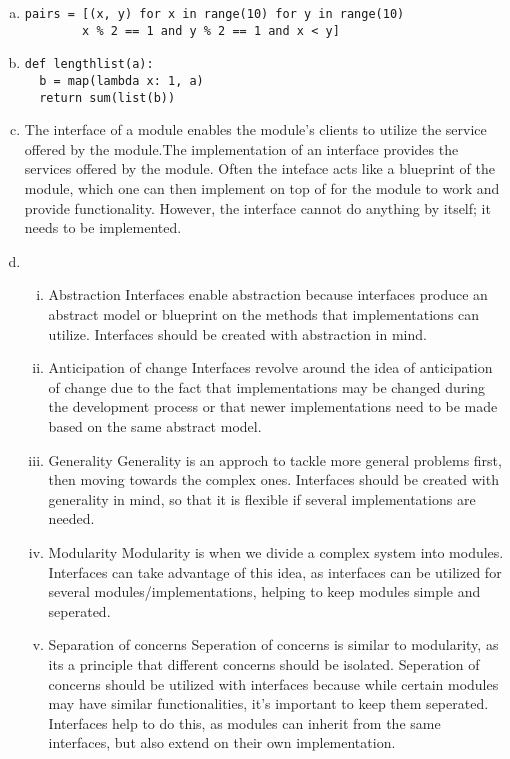 \documentclass[12pt]{article}
\begin{document}
\begin{enumerate}[a)]
\item
\begin{lstlisting}
pairs = [(x, y) for x in range(10) for y in range(10) 
		x % 2 == 1 and y % 2 == 1 and x < y]
\end{lstlisting}

\item
\begin{lstlisting}
def lengthlist(a):
  b = map(lambda x: 1, a)
  return sum(list(b))
\end{lstlisting}

\item
The interface of a module enables the module's clients to utilize the service offered by the module.The implementation of an interface provides the services offered by the module. Often the inteface acts like a blueprint of the module, which one can then implement on top of for the module to work and provide functionality. However, the interface cannot do anything by itself; it needs to be implemented.

\item
  \begin{enumerate}[i)]
\item Abstraction
Interfaces enable abstraction because interfaces produce an abstract model or blueprint on the methods that implementations can utilize. Interfaces should be created with abstraction in mind. 
\item Anticipation of change
Interfaces revolve around the idea of anticipation of change due to the fact that implementations may be changed during the development process or that newer implementations need to be made based on the same abstract model. 
\item Generality
Generality is an approch to tackle more general problems first, then moving towards the complex ones. Interfaces should be created with generality in mind, so that it is flexible if several implementations are needed.
\item Modularity
Modularity is when we divide a complex system into modules. Interfaces can take advantage of this idea, as interfaces can be utilized for several modules/implementations, helping to keep modules simple and seperated.  
\item Separation of concerns
Seperation of concerns is similar to modularity, as its a principle that different concerns should be isolated. Seperation of concerns should be utilized with interfaces because while certain modules may have similar functionalities, it's important to keep them seperated. Interfaces help to do this, as modules can inherit from the same interfaces, but also extend on their own implementation.

\end{enumerate}

\end{enumerate}
\end{document}
